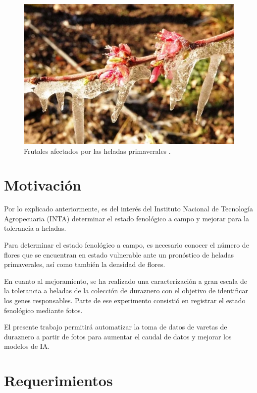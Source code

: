 \begin{figure}[htpb]
	\centering
	\includegraphics[scale=.3]{./Figures/heladas3.jpeg}
	\caption{Frutales afectados por las heladas primaverales \cite{WEBSITE:1}.}
	\label{fig:helada}
\end{figure}

\section{Motivación}

Por lo explicado anteriormente, es del interés del Instituto Nacional de Tecnología Agropecuaria (INTA) determinar el estado fenológico a campo y mejorar para la tolerancia a heladas.

Para determinar el estado fenológico a campo, es necesario conocer el número de flores que se encuentran en estado vulnerable ante un pronóstico de heladas primaverales, así como también la densidad de flores.

En cuanto al mejoramiento, se ha realizado una caracterización a gran escala de la tolerancia a heladas de la colección de duraznero con el objetivo de identificar los genes responsables. Parte de ese experimento consistió en registrar el estado fenológico mediante fotos.

El presente trabajo permitirá automatizar la toma de datos de varetas de duraznero a partir de fotos para aumentar el caudal de datos y mejorar los modelos de IA.

\section{Requerimientos}

